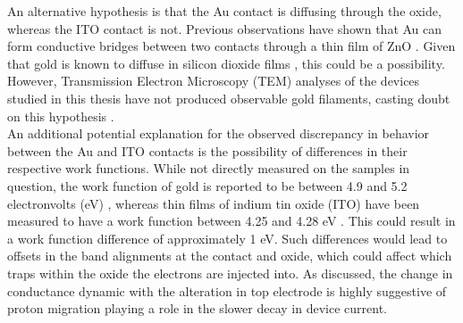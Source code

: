 
\noindent An alternative hypothesis is that the Au contact is diffusing through the oxide, whereas the ITO contact is not. Previous observations have shown that Au can form conductive bridges between two contacts through a thin film of ZnO \cite{peng2012resistive}. Given that gold is known to diffuse in silicon dioxide films \cite{madams1974migration}, this could be a possibility. However, Transmission Electron Microscopy (TEM) analyses of the devices studied in this thesis have not produced observable gold filaments, casting doubt on this hypothesis \cite{mehonic2017intrinsic}.\\




\noindent An additional potential explanation for the observed discrepancy in behavior between the Au and ITO contacts is the possibility of differences in their respective work functions. While not directly measured on the samples in question, the work function of gold is reported to be between 4.9 and 5.2 electronvolts (eV) \cite{tran2019anisotropic}, whereas thin films of indium tin oxide (ITO) have been measured to have a work function between 4.25 and 4.28 eV \cite{schlaf2001work}. This could result in a work function difference of approximately 1 eV. Such differences would lead to offsets in the band alignments at the contact and oxide, which could affect which traps within the oxide the electrons are injected into. As discussed, the change in conductance dynamic with the alteration in top electrode is highly suggestive of proton migration playing a role in the slower decay in device current.

